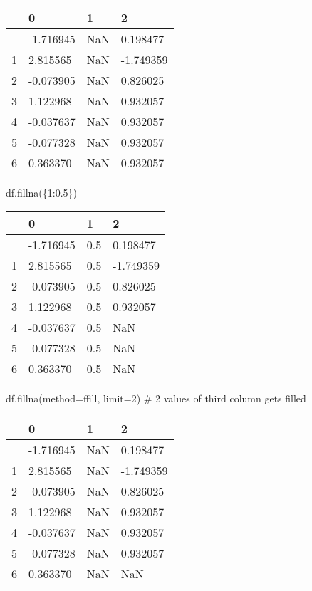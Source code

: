 \documentclass[
  letterpaper,
  DIV=11,
  numbers=noendperiod]{scrreprt}
\newenvironment{Shaded}{\begin{snugshade}}{\end{snugshade}}
\newcommand{\CommentTok}[1]{\textcolor[rgb]{0.37,0.37,0.37}{#1}}
\newcommand{\DecValTok}[1]{\textcolor[rgb]{0.68,0.00,0.00}{#1}}
\newcommand{\FloatTok}[1]{\textcolor[rgb]{0.68,0.00,0.00}{#1}}
\newcommand{\NormalTok}[1]{\textcolor[rgb]{0.00,0.23,0.31}{#1}}
\newcommand{\OperatorTok}[1]{\textcolor[rgb]{0.37,0.37,0.37}{#1}}
\newcommand{\StringTok}[1]{\textcolor[rgb]{0.13,0.47,0.30}{#1}}
\begin{document}
\begin{longtable}[]{@{}llll@{}}
\toprule\noalign{}
& 0 & 1 & 2 \\
\midrule\noalign{}
\endhead
\bottomrule\noalign{}
\endlastfoot
0 & -1.716945 & NaN & 0.198477 \\
1 & 2.815565 & NaN & -1.749359 \\
2 & -0.073905 & NaN & 0.826025 \\
3 & 1.122968 & NaN & 0.932057 \\
4 & -0.037637 & NaN & 0.932057 \\
5 & -0.077328 & NaN & 0.932057 \\
6 & 0.363370 & NaN & 0.932057 \\
\end{longtable}

\begin{Shaded}
\begin{Highlighting}[]
\NormalTok{df.fillna(\{}\DecValTok{1}\NormalTok{:}\FloatTok{0.5}\NormalTok{\})}
\end{Highlighting}
\end{Shaded}

\begin{longtable}[]{@{}llll@{}}
\toprule\noalign{}
& 0 & 1 & 2 \\
\midrule\noalign{}
\endhead
\bottomrule\noalign{}
\endlastfoot
0 & -1.716945 & 0.5 & 0.198477 \\
1 & 2.815565 & 0.5 & -1.749359 \\
2 & -0.073905 & 0.5 & 0.826025 \\
3 & 1.122968 & 0.5 & 0.932057 \\
4 & -0.037637 & 0.5 & NaN \\
5 & -0.077328 & 0.5 & NaN \\
6 & 0.363370 & 0.5 & NaN \\
\end{longtable}

\begin{Shaded}
\begin{Highlighting}[]
\NormalTok{df.fillna(method}\OperatorTok{=}\StringTok{\textquotesingle{}ffill\textquotesingle{}}\NormalTok{, limit}\OperatorTok{=}\DecValTok{2}\NormalTok{) }\CommentTok{\# 2 values of third column gets filled}
\end{Highlighting}
\end{Shaded}

\begin{longtable}[]{@{}llll@{}}
\toprule\noalign{}
& 0 & 1 & 2 \\
\midrule\noalign{}
\endhead
\bottomrule\noalign{}
\endlastfoot
0 & -1.716945 & NaN & 0.198477 \\
1 & 2.815565 & NaN & -1.749359 \\
2 & -0.073905 & NaN & 0.826025 \\
3 & 1.122968 & NaN & 0.932057 \\
4 & -0.037637 & NaN & 0.932057 \\
5 & -0.077328 & NaN & 0.932057 \\
6 & 0.363370 & NaN & NaN \\
\end{longtable}
\end{document}
